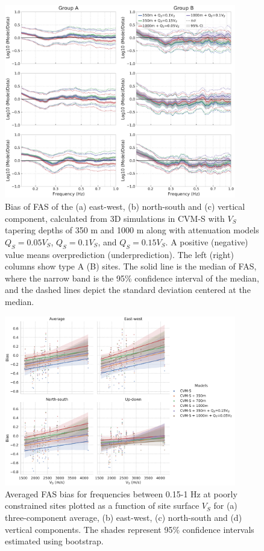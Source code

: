 \begin{figure}[!ht]
  \centering
  \includegraphics[width=0.9\textwidth]{figures/figure_vs30_S2.pdf}
  \caption{Bias of FAS of the (a) east-west, (b) north-south and (c) vertical component, calculated from 3D simulations in CVM-S with $V_S$ tapering depths of 350 m and 1000 m along with attenuation models $Q_S=0.05V_S$, $Q_S=0.1V_S$, and $Q_S=0.15V_S$. A positive (negative) value means overprediction (underprediction). The left (right) columns show type A (B) sites. The solid line is the median of FAS, where the narrow band is the 95\% confidence interval of the median, and the dashed lines depict the standard deviation centered at the median.}
  \label{fig:vs30-S2}
\end{figure}
\clearpage

\begin{figure}[!ht]
  \centering
  \includegraphics[width=0.9\textwidth]{figures/figure_vs30_S3.pdf}
  \caption{Averaged FAS bias for frequencies between 0.15-1 Hz at poorly constrained sites plotted as a function of site surface $V_S$ for (a) three-component average, (b) east-west, (c) north-south and (d) vertical components. The shades represent 95\% confidence intervals estimated using bootstrap.}
  \label{fig:vs30-S3}
\end{figure}


\renewcommand{\thetable}{\arabic{table}}
\renewcommand{\thefigure}{\arabic{figure}}


